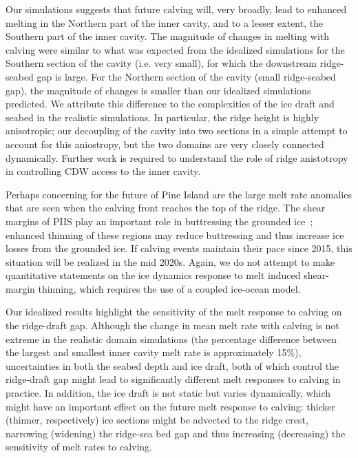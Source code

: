 \documentclass[draft]{agujournal2019}
\begin{document}
Our simulations suggests that future calving will, very broadly, lead to enhanced melting in the Northern part of the inner cavity, and to a lesser extent, the Southern part of the inner cavity. The magnitude of changes in melting with calving were similar to what was expected from the idealized simulations for the Southern section of the cavity (i.e. very small), for which the downstream ridge-seabed gap is large. For the Northern section of the cavity (small ridge-seabed gap), the magnitude of changes is smaller than our idealized simulations predicted. We attribute this difference to the complexities of the ice draft and seabed in the realistic simulations. In particular, the ridge height is highly anisotropic; our decoupling of the cavity into two sections in a simple attempt to account for this aniostropy, but the two domains are very closely connected dynamically. Further work is required to understand the role of ridge anistotropy in controlling CDW access to the inner cavity.

Perhaps concerning for the future of Pine Island are the large melt rate anomalies that are seen when the calving front reaches the top of the ridge. The shear margins of PIIS play an important role in buttressing the grounded ice~\cite{Lhermitte2020PNAS}; enhanced thinning of these regions may reduce buttressing and thus increase ice losses from the grounded ice. If calving events maintain their pace since 2015, this situation will be realized in the mid 2020s. Again, we do not attempt to make quantitative statements on the ice dynamics response to melt induced shear-margin thinning, which requires the use of a coupled ice-ocean model.

Our idealized results highlight the sensitivity of the melt response to calving on the ridge-draft gap. Although the change in mean melt rate with calving is not extreme in the realistic domain simulations (the percentage difference between the largest and smallest inner cavity melt rate is approximately 15\%), uncertainties in both the seabed depth and ice draft, both of which control the ridge-draft gap might lead to significantly different melt responses to calving in practice. In addition, the ice draft is not static but varies dynamically, which might have an important effect on the future melt response to calving: thicker (thinner, respectively) ice sections might be advected to the ridge crest, narrowing (widening) the ridge-sea bed gap and thus increasing (decreasing) the sensitivity of melt rates to calving.
\end{document}
